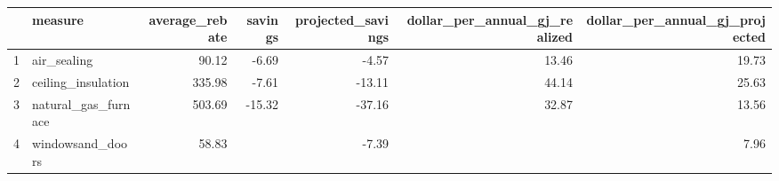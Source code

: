 \begin{table}[ht]
\centering
\begin{tabular}{rlrrrrr}
  \hline
 & measure & average\_rebate & savings & projected\_savings & dollar\_per\_annual\_gj\_realized & dollar\_per\_annual\_gj\_projected \\ 
  \hline
1 & air\_sealing & 90.12 & -6.69 & -4.57 & 13.46 & 19.73 \\ 
  2 & ceiling\_insulation & 335.98 & -7.61 & -13.11 & 44.14 & 25.63 \\ 
  3 & natural\_gas\_furnace & 503.69 & -15.32 & -37.16 & 32.87 & 13.56 \\ 
  4 & windowsand\_doors & 58.83 &  & -7.39 &  & 7.96 \\ 
   \hline
\end{tabular}
\end{table}
